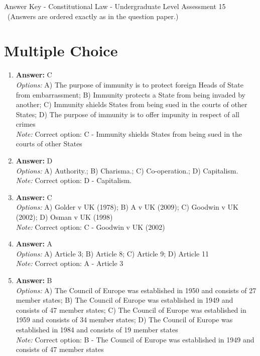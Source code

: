 \documentclass[12pt]{article}
\begin{document}
\begin{center}
Answer Key - Constitutional Law - Undergraduate Level Assessment 15 \
\small (Answers are ordered exactly as in the question paper.)
\end{center}

\section*{Multiple Choice}
\begin{enumerate}[label=\arabic*.]
\item \textbf{Answer:} C
\\ \textit{Options:} A) The purpose of immunity is to protect foreign Heads of State from embarrassment; B) Immunity protects a State from being invaded by another; C) Immunity shields States from being sued in the courts of other States; D) The purpose of immunity is to offer impunity in respect of all crimes
\\ \textit{Note:} Correct option: C - Immunity shields States from being sued in the courts of other States
\item \textbf{Answer:} D
\\ \textit{Options:} A) Authority.; B) Charisma.; C) Co-operation.; D) Capitalism.
\\ \textit{Note:} Correct option: D - Capitalism.
\item \textbf{Answer:} C
\\ \textit{Options:} A) Golder v UK (1978); B) A v UK (2009); C) Goodwin v UK (2002); D) Osman v UK (1998)
\\ \textit{Note:} Correct option: C - Goodwin v UK (2002)
\item \textbf{Answer:} A
\\ \textit{Options:} A) Article 3; B) Article 8; C) Article 9; D) Article 11
\\ \textit{Note:} Correct option: A - Article 3
\item \textbf{Answer:} B
\\ \textit{Options:} A) The Council of Europe was established in 1950 and consists of 27 member states; B) The Council of Europe was established in 1949 and consists of 47 member states; C) The Council of Europe was established in 1959 and consists of 34 member states; D) The Council of Europe was established in 1984 and consists of 19 member states
\\ \textit{Note:} Correct option: B - The Council of Europe was established in 1949 and consists of 47 member states
\end{enumerate}
\end{document}
